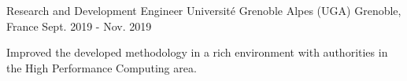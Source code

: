 \begin{cventries}
  \cventry
    {Research and Development Engineer} %
    {Université Grenoble Alpes (UGA)} %
    {Grenoble, France} %
    {Sept. 2019 - Nov. 2019} %
    {
      \begin{cvitems} %
      \item {Improved the developed methodology in a rich environment with
          authorities in the High Performance Computing area.}
      \end{cvitems}
    }


\end{cventries}
